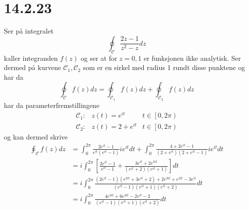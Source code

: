 \documentclass{report}
\newcommand{\nbrack}[1]{\left( #1 \right)}
\newcommand{\bbrack}[1]{\left[ #1 \right]}
\begin{document}
\section*{14.2.23}
Ser på integralet
\begin{equation}
  \label{eq:21}
  \oint_{\mathcal{C}} \frac{2z-1}{z^{2} - z} dz
\end{equation}
kaller integranden $f(z)$ og ser at for $z=0,1$ er funksjonen ikke analytisk. Ser dermed på kurvene $\mathcal{C}_{1}, \mathcal{C}_{2}$ som er en sirkel med radius 1 rundt disse punktene og har da
\begin{equation}
  \label{eq:31}
  \oint_{\mathcal{C}} f(z) dz = \oint_{\mathcal{C}_{1}} f(z) dz + \oint_{\mathcal{C}_{2}} f(z) dz
\end{equation}
har da parameterfremstillingene
\begin{equation}
  \label{eq:33}
  \begin{array}{lll}
    \mathcal{C}_{1}: & z(t) = e^{it} & t \in \left[ 0, 2\pi \right) \\
    \mathcal{C}_{2}: & z(t) = 2 + e^{it} & t \in \left[ 0, 2\pi \right)
  \end{array}
\end{equation}
og kan dermed skrive
\begin{equation}
  \label{eq:32}
  \begin{split}
    \oint_{\mathcal{C}} f(z) dz
    &= \int_{0}^{2\pi} \frac{2e^{it} - 1}{e^{it} \nbrack{ e^{it} - 1 }} ie^{it} dt + \int_{0}^{2\pi} \frac{ 4 + 2e^{it} - 1 }{ \nbrack{ 2+e^{it} } \nbrack{ 2 + e^{it} - 1 } } ie^{it} dt \\
    &= i\int_{0}^{2\pi} \bbrack{ \frac{2e^{it} - 1}{e^{it} - 1} + \frac{ 3e^{it} + 2e^{2it} }{ \nbrack{e^{it}+2} \nbrack{e^{it}+1} } }dt \\
    &= i \int_{0}^{2\pi} \frac{ \nbrack{2e^{it}-1} \nbrack{e^{2it} + 3e^{it} + 2} + 2e^{3it} + e^{2it} - 3e^{it} }{ \nbrack{e^{it}-1} \nbrack{e^{it}+1} \nbrack{e^{it}+2} } dt \\
    &= i \int_{0}^{2\pi} \frac{ 4e^{3it} + 6e^{2it} - 2e^{it} - 2 }{\nbrack{e^{it}-1} \nbrack{e^{it}+1} \nbrack{e^{it}+2}} dt
  \end{split}
\end{equation}
\end{document}
